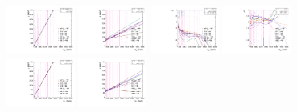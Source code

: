 \begin{figure}[htbp]
  \centering
  \includegraphics[width=0.2\textwidth]{fig/2Dfit/paramSignalShape_allSig_MVV_HP_nobb_LDy_MEAN.pdf}
  \includegraphics[width=0.2\textwidth]{fig/2Dfit/paramSignalShape_allSig_MVV_HP_nobb_LDy_SIGMA.pdf}
  \includegraphics[width=0.2\textwidth]{fig/2Dfit/paramSignalShape_allSig_MVV_HP_nobb_LDy_ALPHA1.pdf}
  \includegraphics[width=0.2\textwidth]{fig/2Dfit/paramSignalShape_allSig_MVV_HP_nobb_LDy_ALPHA2.pdf}\\
  \includegraphics[width=0.2\textwidth]{fig/2Dfit/paramSignalShape_allSig_MVV_LP_nobb_LDy_MEAN.pdf}
  \includegraphics[width=0.2\textwidth]{fig/2Dfit/paramSignalShape_allSig_MVV_LP_nobb_LDy_SIGMA.pdf}

\end{figure}
